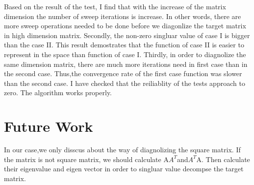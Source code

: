 \documentclass[12pts]{article}
\begin{document}
Based on the result of the test, I find that with the increase of the matrix dimension the number of sweep iterations is increase. In other words, there are more sweep operations needed to be done before we diagonlize the target matrix in high dimension matrix. Secondly, the non-zero singluar value of case I is bigger than the case II. This result demostrates that the function of case II is easier to represent in the space than function of case I. Thirdly, in order to diagnolize the same dimension matrix, there are much more iterations need in first case than in the second case. Thus,the convergence rate of the first case function was slower than the second case. I have checked that the reiliablity of the tests approach to zero. The algorithm works properly. 
 
\section{Future Work}
In our case,we only disscus about the way of diagnolizing the square matrix. If the matrix is not square matrix, we should calculate A$A^T$and$A^T$A. Then calculate their eigenvalue and eigen vector in order to singluar value decompse the target matrix.
\end{document}
